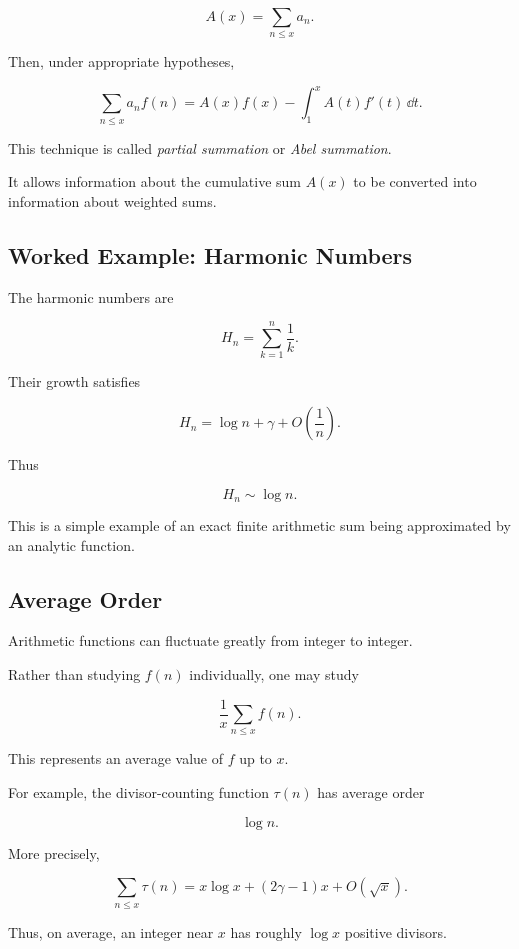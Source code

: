 \[ A(x)=\sum_{n\leq x}a_n. \]

Then, under appropriate hypotheses,

\[
\boxed{
\sum_{n\leq x}a_n f(n)
=
A(x)f(x)
-
\int_1^x A(t)f'(t)\,\dd t.
}
\]

This technique is called \emph{partial summation} or \emph{Abel summation}.

It allows information about the cumulative sum \(A(x)\) to be converted into
information about weighted sums.

\subsection{Worked Example: Harmonic Numbers}
\label{subsec:worked-harmonic-asymptotic}

The harmonic numbers are

\[ H_n=\sum_{k=1}^{n}\frac1k. \]

Their growth satisfies

\[ H_n=\log n+\gamma+O\left(\frac1n\right). \]

Thus

\[ H_n\sim\log n. \]

This is a simple example of an exact finite arithmetic sum being approximated
by an analytic function.

\subsection{Average Order}
\label{subsec:average-order}

Arithmetic functions can fluctuate greatly from integer to integer.

Rather than studying \(f(n)\) individually, one may study

\[ \frac1x\sum_{n\leq x}f(n). \]

This represents an average value of \(f\) up to \(x\).

For example, the divisor-counting function \(\tau(n)\) has average order

\[ \log n. \]

More precisely,

\[ \sum_{n\leq x}\tau(n)=x\log x+(2\gamma-1)x+O(\sqrt{x}). \]

Thus, on average, an integer near \(x\) has roughly \(\log x\) positive
divisors.

